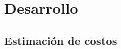 \documentclass[letterpaper]{article}
\begin{document}
\newpage{}

\section{Desarrollo}\label{sec:ana}



\subsection{Estimación de costos}\label{sec:sc}



\newpage{}

\printglossary{}

\newpage{}

\listoftables{}
\listoffigures{}
\end{document}
